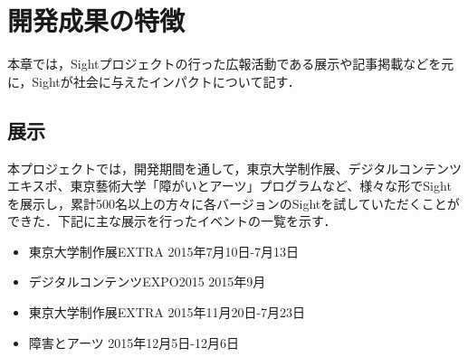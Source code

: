 \section{開発成果の特徴}

本章では，Sightプロジェクトの行った広報活動である展示や記事掲載などを元に，Sightが社会に与えたインパクトについて記す．


\subsection{展示}

本プロジェクトでは，開発期間を通して，東京大学制作展、デジタルコンテンツエキスポ、東京藝術大学「障がいとアーツ」プログラムなど、様々な形でSightを展示し，累計500名以上の方々に各バージョンのSightを試していただくことができた．下記に主な展示を行ったイベントの一覧を示す．

\begin{itemize}
 \item 東京大学制作展EXTRA 2015年7月10日-7月13日
 \item デジタルコンテンツEXPO2015 2015年9月
 \item 東京大学制作展EXTRA 2015年11月20日-7月23日
 \item 障害とアーツ 2015年12月5日-12月6日
\end{itemize}


